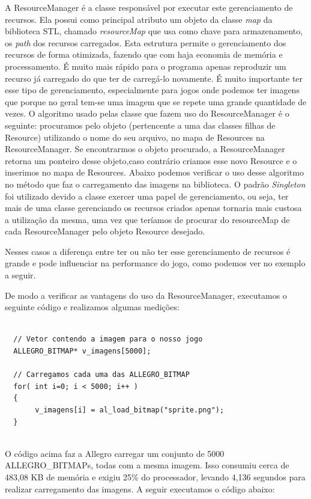 %
%
\par 
A ResourceManager é a classe responsável por executar este gerenciamento de recursos. Ela possui como principal atributo um objeto da classe \textit{map} da biblioteca STL, chamado \textit{resourceMap} que usa como chave para armazenamento, os \textit{path} dos recursos carregados.  
Esta estrutura permite o gerenciamento dos recursos de forma otimizada, fazendo que com haja economia de memória e processamento. É muito mais rápido para o programa apenas reproduzir um recurso já carregado do que ter de carregá-lo novamente. É muito importante ter esse tipo de gerenciamento, especialmente para jogos onde podemos ter imagens que porque no geral tem-se uma imagem que se repete uma grande quantidade de vezes. O algoritmo usado pelas classe que fazem uso do ResourceManager é o seguinte: procuramos pelo objeto (pertencente a uma das classes filhas de Resource) utilizando o nome do seu arquivo, no mapa de Resources na ResourceManager. Se encontrarmos o objeto procurado, a ResourceManager retorna um ponteiro desse objeto,caso contrário criamos esse novo Resource e o inserimos no mapa de Resources. Abaixo podemos verificar o uso desse algoritmo no método que faz o carregamento das imagens na biblioteca. O padrão \textit{Singleton} foi utilizado devido a classe exercer uma papel de gerenciamento, ou seja, ter mais de uma classe gerenciando os recursos criados apenas tornaria mais custosa a utilização da mesma, uma vez que teríamos de procurar do resourceMap de cada ResourceManager pelo objeto Resource desejado.
%

%
\par 
Nesses casos a diferença entre ter ou não ter esse gerenciamento de recursos é grande e pode influenciar na performance do jogo, como podemos ver no exemplo a seguir.
\par 
De modo a verificar as vantagens do uso da ResourceManager, executamos o seguinte código e realizamos algumas medições: 
%
%
\begin{lstlisting}

  // Vetor contendo a imagem para o nosso jogo
  ALLEGRO_BITMAP* v_imagens[5000];
      
  // Carregamos cada uma das ALLEGRO_BITMAP
  for( int i=0; i < 5000; i++ )
  {
       v_imagens[i] = al_load_bitmap("sprite.png");
  }
  
\end{lstlisting}
%
\par
O código acima faz a Allegro carregar um conjunto de 5000 ALLEGRO\_BITMAPs, todas com a mesma imagem. Isso consumiu cerca de 483,08 KB de memória e exigiu 25\% do processador, levando 4,136 segundos para realizar carregamento das imagens. A seguir executamos o código abaixo:
